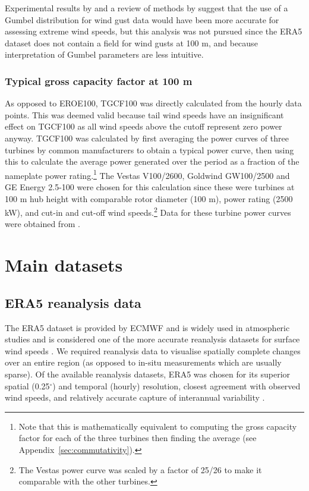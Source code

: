 Experimental results by \citet{lee2012} and a review of methods by \citet{palutikof1999} suggest that the use of a Gumbel distribution for wind gust data would have been more accurate for assessing extreme wind speeds, but this analysis was not pursued since the ERA5 dataset does not contain a field for wind gusts at 100 m, and because interpretation of Gumbel parameters are less intuitive.

\subsubsection{Typical gross capacity factor at 100 m}

As opposed to EROE100, \ac{TGCF100} was directly calculated from the hourly data points. This was deemed valid because tail wind speeds have an insignificant effect on \ac{TGCF100} as all wind speeds above the cutoff represent zero power anyway. \ac{TGCF100} was calculated by first averaging the power curves of three turbines by common manufacturers to obtain a typical power curve, then using this to calculate the average power generated over the period as a fraction of the nameplate power rating.\footnote{Note that this is mathematically equivalent to computing the gross capacity factor for each of the three turbines then finding the average (see Appendix~\ref{sec:commutativity}).} The Vestas V100/2600, Goldwind GW100/2500 and GE Energy 2.5-100 were chosen for this calculation since these were turbines at 100 m hub height with comparable rotor diameter (100 m), power rating (2500 kW), and cut-in and cut-off wind speeds.\footnote{The Vestas power curve was scaled by a factor of 25/26 to make it comparable with the other turbines.} Data for these turbine power curves were obtained from \citet{twp_ge, twp_gw, twp_vt}.

\section{Main datasets}

\subsection{ERA5 reanalysis data}

The \ac{ERA5} dataset is provided by \ac{ECMWF} and is widely used in atmospheric studies and is considered one of the more accurate reanalysis datasets for surface wind speeds \citep{era5, torralba2017, ramon2019, clarke2021, fan2021}. We required reanalysis data to visualise spatially complete changes over an entire region (as opposed to in-situ measurements which are usually sparse). Of the available reanalysis datasets, ERA5 was chosen for its superior spatial (0.25$^\circ$) and temporal (hourly) resolution, closest agreement with observed wind speeds, and relatively accurate capture of interannual variability \citep{torralba2017, ramon2019, clarke2021, fan2021}.

